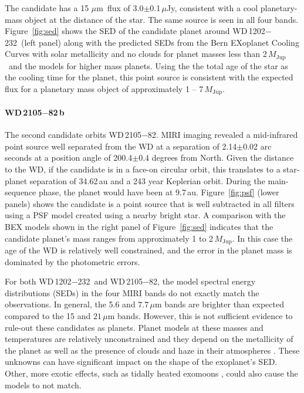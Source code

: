 \documentclass[twocolumn]{aastex631}
\newcommand{\mj}{\,$M_\mathrm{Jup}$}
\newcommand{\um}{\,$\mu$m}
\newcommand{\muJy}{\,$\mu$Jy}
\newcommand{\wdA}{WD\,1202$-$232}
\newcommand{\wdB}{WD\,2105$-$82}
\begin{document}
The candidate has a 15\,\um\ flux of 3.0$\pm$0.1\muJy, consistent with a cool planetary-mass object at the distance of the star. The same source is seen in all four bands. Figure~\ref{fig:sed} shows the SED of the candidate planet around \wdA\ (left panel)
along with the predicted SEDs from the Bern EXoplanet Cooling Curves with solar metallicity and no clouds \citep[BEX,][]{Linder2019} for planet masses less than 2\mj\ and the \citet{Burrows2003} models for higher mass planets.  Using the the total age of the star as the cooling time for the planet, this point source is consistent with the expected flux for a planetary mass object of approximately 1 -- 7\mj. 

\paragraph{\wdB\,b} The second candidate orbits \wdB. MIRI imaging revealed a mid-infrared point source well separated from the WD at a separation of 2.14$\pm$0.02 arc seconds at a position angle of 200.4$\pm$0.4 degrees from North.  Given the distance to the WD, if the candidate is in a face-on circular orbit, this translates to a star-planet separation of 34.62\,au and a 243 year Keplerian orbit. During the main-sequence phase, the planet would have been at 9.7\,au. Figure~\ref{fig:psf} (lower panels) shows the candidate is a point source that is well subtracted in all filters using a PSF model created using a nearby bright star. A comparison with the BEX models \citep{Linder19} shown in the right panel of Figure~\ref{fig:sed} indicates that the candidate planet's mass ranges from approximately 1 to 2\mj.  In this case the age of the WD is relatively well constrained, and the error in the planet mass is dominated by the photometric errors.

For both \wdA\ and \wdB, the model spectral energy distributions (SEDs) in the four MIRI bands do not exactly match the observations. In general, the 5.6 and $7.7\,\mu$m bands are brighter than expected compared to the 15 and $21\,\mu$m  bands. However, this is not sufficient evidence to rule-out these candidates as planets. Planet models at these masses and temperatures are relatively unconstrained and they depend on the metallicity of the planet as well as the presence of clouds and haze in their atmospheres \citep{Marley2021, Limbach2022}. These unknowns can have significant impact on the shape of the exoplanet's SED. Other, more exotic effects, such as tidally heated exomoons \citep{limbach13}, could also cause the models to not match. 
\end{document}
